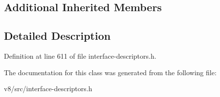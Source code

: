 \subsection*{Additional Inherited Members}


\subsection{Detailed Description}


Definition at line 611 of file interface-\/descriptors.\+h.



The documentation for this class was generated from the following file\+:\begin{DoxyCompactItemize}
\item 
v8/src/interface-\/descriptors.\+h\end{DoxyCompactItemize}
